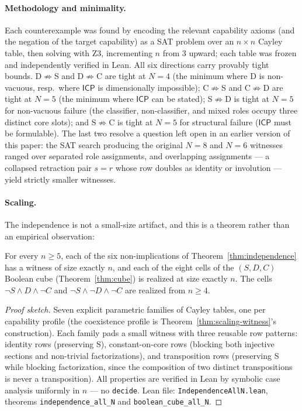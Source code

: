 \documentclass[sigconf,screen]{acmart}
\newcommand{\ICP}{\textsf{ICP}}
\theoremstyle{remark}
\begin{document}
\paragraph{Methodology and minimality.}
Each counterexample was found by encoding the relevant capability axioms (and the negation of the target capability) as a SAT problem over an $n \times n$ Cayley table, then solving with Z3, incrementing $n$ from 3 upward; each table was frozen and independently verified in Lean. All six directions carry provably tight bounds. D$\not\Rightarrow$S and D$\not\Rightarrow$C are tight at $N\!=\!4$ (the minimum where D is non-vacuous, resp.\ where $\ICP$ is dimensionally impossible); C$\not\Rightarrow$S and C$\not\Rightarrow$D are tight at $N\!=\!5$ (the minimum where $\ICP$ can be stated); S$\not\Rightarrow$D is tight at $N\!=\!5$ for non-vacuous failure (the classifier, non-classifier, and mixed roles occupy three distinct core slots); and S$\not\Rightarrow$C is tight at $N\!=\!5$ for structural failure ($\ICP$ must be formulable). The last two resolve a question left open in an earlier version of this paper: the SAT search producing the original $N\!=\!8$ and $N\!=\!6$ witnesses ranged over separated role assignments, and overlapping assignments --- a collapsed retraction pair $s = r$ whose row doubles as identity or involution --- yield strictly smaller witnesses.

\paragraph{Scaling.}
The independence is not a small-size artifact, and this is a theorem rather than an empirical observation:

\begin{theorem}
\label{thm:scaling-nonimp}
For every $n \geq 5$, each of the six non-implications of Theorem~\ref{thm:independence} has a witness of size exactly $n$, and each of the eight cells of the $(S, D, C)$ Boolean cube (Theorem~\ref{thm:cube}) is realized at size exactly $n$. The cells $\neg S \land D \land \neg C$ and $\neg S \land \neg D \land \neg C$ are realized from $n \geq 4$.
\end{theorem}

\begin{proof}[Proof sketch]
Seven explicit parametric families of Cayley tables, one per capability profile (the coexistence profile is Theorem~\ref{thm:scaling-witness}'s construction). Each family pads a small witness with three reusable row patterns: identity rows (preserving S), constant-on-core rows (blocking both injective sections and non-trivial factorizations), and transposition rows (preserving S while blocking factorization, since the composition of two distinct transpositions is never a transposition). All properties are verified in Lean by symbolic case analysis uniformly in $n$ --- no \texttt{decide}. Lean file: \texttt{IndependenceAllN.lean}, theorems \texttt{independence\_all\_N} and \texttt{boolean\_cube\_all\_N}.
\end{proof}
\end{document}
